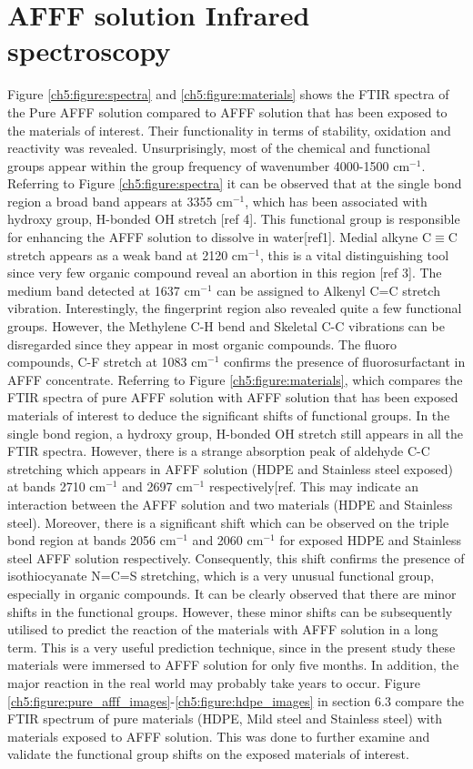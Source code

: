 \section{AFFF solution Infrared spectroscopy}
Figure \ref{ch5:figure:spectra} and \ref{ch5:figure:materials} shows the FTIR spectra of the Pure AFFF solution compared to AFFF solution that has been exposed to the materials of interest.  Their functionality in terms of stability, oxidation and reactivity was revealed. Unsurprisingly, most of the chemical and functional groups appear within the group frequency of wavenumber 4000-1500 cm$^{-1}$.
Referring to Figure \ref{ch5:figure:spectra} it can be observed that at the single bond region a broad band appears at 3355 cm$^{-1}$, which has been associated with hydroxy group, H-bonded OH stretch [ref 4]. This functional group is responsible for enhancing the AFFF solution to dissolve in water[ref1].  Medial alkyne C$\equiv$C stretch appears as a weak band at 2120 cm$^{-1}$, this is a vital distinguishing tool since very few organic compound reveal an abortion in this region [ref 3]. The medium band detected at 1637 cm$^{-1}$ can be assigned to Alkenyl C=C stretch vibration. Interestingly, the fingerprint region also revealed quite a few functional groups. However, the Methylene C-H bend and Skeletal C-C vibrations can be disregarded since they appear in most organic compounds. The fluoro compounds, C-F stretch at 1083 cm$^{-1}$ confirms the presence of fluorosurfactant in AFFF concentrate. 
Referring to Figure \ref{ch5:figure:materials}, which compares the FTIR spectra of pure AFFF solution with AFFF solution that has been exposed materials of interest to deduce the significant shifts of functional groups. In the single bond region, a hydroxy group, H-bonded OH stretch still appears in all the FTIR spectra. However, there is a strange absorption peak of aldehyde C-C stretching which appears in AFFF solution (HDPE and Stainless steel exposed) at bands 2710 cm$^{-1}$  and 2697 cm$^{-1}$ respectively[ref. This may indicate an interaction between the AFFF solution and two materials (HDPE and Stainless steel). Moreover, there is a significant shift which can be observed on the triple bond region at bands 2056 cm$^{-1}$ and 2060 cm$^{-1}$ for exposed HDPE and Stainless steel AFFF solution respectively. Consequently, this shift confirms the presence of isothiocyanate N=C=S stretching, which is a very unusual functional group, especially in organic compounds.
It can be clearly observed that there are minor shifts in the functional groups. However, these minor shifts can be subsequently utilised to predict the reaction of the materials with AFFF solution in a long term. This is a very useful prediction technique, since in the present study these materials were immersed to AFFF solution for only five months. In addition, the major reaction in the real world may probably take years to occur. Figure \ref{ch5:figure:pure_afff_images}-\ref{ch5:figure:hdpe_images} in section 6.3 compare the FTIR spectrum of pure materials (HDPE, Mild steel and Stainless steel) with materials exposed to AFFF solution. This was done to further examine and validate the functional group shifts on the exposed materials of interest.  

